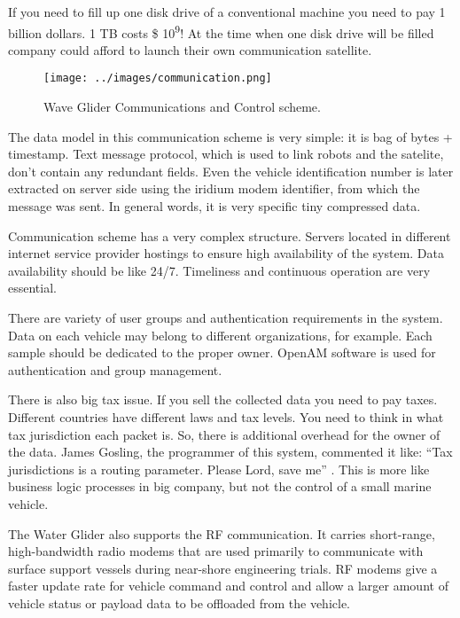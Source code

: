 If you need to fill up one disk drive of a conventional machine you need to pay 1 billion dollars. 1 TB costs  \$ 10\textsuperscript{9}! At the time when one disk drive will be filled company could afford to launch their own communication satellite.


\begin{center}
  \begin{figure}[h]	
	\texttt{[image: ../images/communication.png]}		
	\caption{Wave Glider Communications and Control scheme. \cite{5422129} }   
	\label{fig:glider_communication_scheme}
  \end{figure}
\end{center} 




The data model in this communication scheme is very simple: it is bag of bytes + timestamp. Text message protocol, which is used to link robots and the satelite, don't contain any redundant fields. Even the vehicle identification number is later extracted on server side using the iridium modem identifier, from which the message was sent. In general words, it is very specific tiny compressed data.

Communication scheme has a very complex structure. Servers located in different internet service provider hostings to ensure high availability of the system. Data availability should be like 24/7.  Timeliness and continuous operation are very essential.

There are variety of user groups and authentication requirements in the system. Data on each vehicle may belong to different organizations, for example. Each sample should be dedicated to the proper owner. OpenAM software is used for authentication and group management.

There is also big tax issue. If you sell the collected data you need to pay taxes. Different countries have different laws and tax levels. You need to think in what tax jurisdiction each packet is. So, there is additional overhead for the owner of the data. James Gosling, the programmer of this system, commented it like: “Tax jurisdictions is a routing parameter. Please Lord, save me” \cite{video:james_gosling_on_youtube}. This is more like business logic processes in big company, but not the control of a small marine vehicle.

The Water Glider also  supports the RF communication. It carries short-range, high-bandwidth radio modems that are used primarily to communicate with surface support vessels during near-shore engineering trials. RF modems give a faster update rate for vehicle command and control and allow a larger amount of vehicle status or payload data to be offloaded from the vehicle. 


